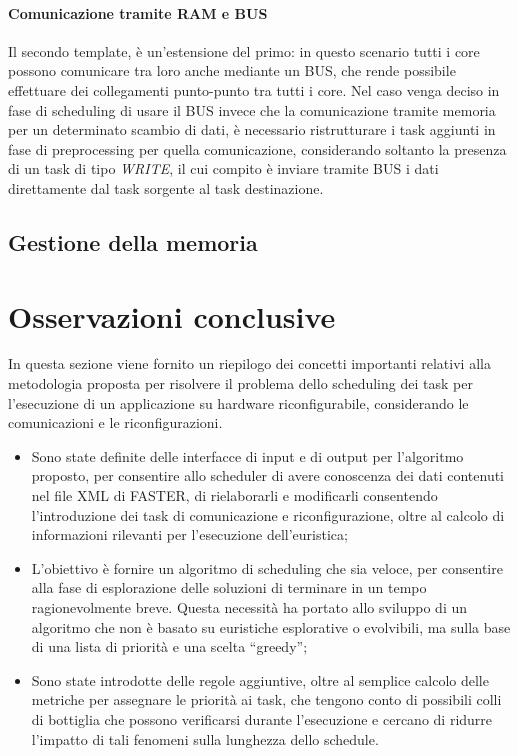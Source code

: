 \paragraph{Comunicazione tramite \acs{RAM} e BUS}
Il secondo template, è un'estensione del primo: in questo scenario tutti i 
core possono comunicare tra loro anche mediante un BUS, che rende possibile 
effettuare dei collegamenti punto-punto tra tutti i core. Nel caso venga deciso 
in fase di scheduling di usare il BUS invece che la comunicazione tramite 
memoria per un determinato scambio di dati, è necessario ristrutturare i task 
aggiunti in fase di preprocessing per quella comunicazione, considerando 
soltanto la presenza di un task di tipo \emph{WRITE}, il cui compito è inviare 
tramite BUS i dati direttamente dal task sorgente al task destinazione.



\subsection{Gestione della memoria}
\label{sec:gestioneMemoria}


\section{Osservazioni conclusive}
\label{sec:osservazioniConclusive}
In questa sezione viene fornito un riepilogo dei concetti importanti relativi 
alla metodologia proposta per risolvere il problema dello scheduling dei task 
per l'esecuzione di un applicazione su hardware riconfigurabile, considerando 
le comunicazioni e le riconfigurazioni.

\begin{itemize}
  \item Sono state definite delle interfacce di input e di output per 
l'algoritmo proposto, per consentire allo scheduler di avere conoscenza dei 
dati contenuti nel file XML di \ac{FASTER}, di rielaborarli e modificarli 
consentendo l'introduzione dei task di comunicazione e riconfigurazione, oltre 
al calcolo di informazioni rilevanti per l'esecuzione dell'euristica;
 \item L'obiettivo è fornire un algoritmo di scheduling che sia veloce, per 
consentire alla fase di esplorazione delle soluzioni di terminare in un tempo 
ragionevolmente breve. Questa necessità ha portato allo sviluppo di un algoritmo 
che non è basato su euristiche esplorative o evolvibili, ma sulla base di una 
lista di priorità e una scelta ``greedy'';
 \item Sono state introdotte delle regole aggiuntive, oltre al semplice calcolo 
delle metriche per assegnare le priorità ai task, che tengono conto di 
possibili colli di bottiglia che possono verificarsi durante l'esecuzione e 
cercano di ridurre l'impatto di tali fenomeni sulla lunghezza dello schedule.
\end{itemize}
